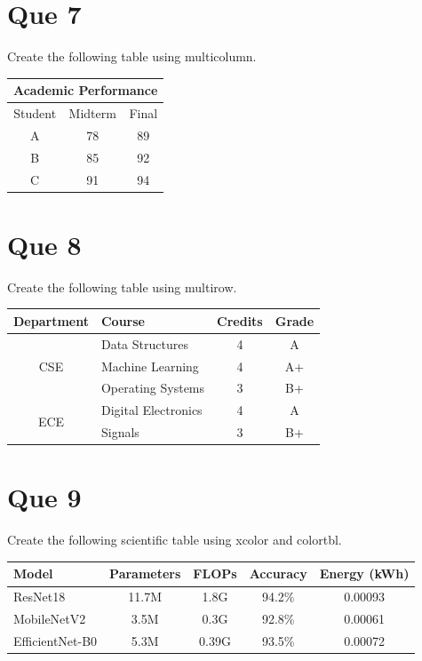 \documentclass[12pt,a4paper]{article}
\begin{document}
	\section*{Que 7}
	
	Create the following table using multicolumn.
	
	\begin{center}
		\begin{tabular}{|c|c|c|}
			\hline
			\multicolumn{3}{|c|}{\textbf{Academic Performance}}\\
			\hline
			Student & Midterm & Final\\
			\hline
			A & 78 & 89\\
			\hline
			B & 85 & 92\\
			\hline
			C & 91 & 94\\
			\hline
		\end{tabular}
	\end{center}
	
	\section*{Que 8}
	
	Create the following table using multirow.
	
	\begin{center}
		\begin{tabular}{|c|l|c|c|}
			\hline
			\textbf{Department} & \textbf{Course} & \textbf{Credits} & \textbf{Grade}\\
			\hline
			\multirow{3}{*}{CSE}
			& Data Structures & 4 & A\\
			\cline{2-4}
			& Machine Learning & 4 & A+\\
			\cline{2-4}
			& Operating Systems & 3 & B+\\
			\hline
			\multirow{2}{*}{ECE}
			& Digital Electronics & 4 & A\\
			\cline{2-4}
			& Signals & 3 & B+\\
			\hline
		\end{tabular}
	\end{center}
	
	\section*{Que 9}
	
	Create the following scientific table using xcolor and colortbl.
	
	\begin{center}
		\begin{tabular}{|l|c|c|c|c|}
			\hline
			\rowcolor{headerblue}
			\color{white}\textbf{Model} &
			\color{white}\textbf{Parameters} &
			\color{white}\textbf{FLOPs} &
			\color{white}\textbf{Accuracy} &
			\color{white}\textbf{Energy (kWh)}\\
			\hline
			\rowcolor{lightblue}
			ResNet18 & 11.7M & 1.8G & 94.2\% & 0.00093\\
			\hline
			MobileNetV2 & 3.5M & 0.3G & 92.8\% & 0.00061\\
			\hline
			\rowcolor{lightblue}
			EfficientNet-B0 & 5.3M & 0.39G & 93.5\% & 0.00072\\
			\hline
		\end{tabular}
	\end{center}
	
\end{document}
